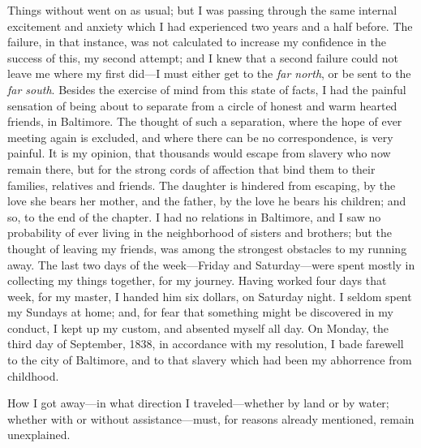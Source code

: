 Things without went on as usual; but I was passing through the same
internal excitement and anxiety which I had experienced two years and a
half before. The failure, in that instance, was not calculated to
increase my confidence in the success of this, my second attempt; and I
knew that a second failure could not leave me where my first did---I
must either get to the \emph{far north}, or be sent to the \emph{far
south}. Besides the exercise of mind from this state of facts, I had the
painful sensation of being about to separate from a circle of honest and
warm hearted friends, in Baltimore. The thought of such a separation,
where the hope of ever meeting again is excluded, and where there can be
no correspondence, is very painful. It is my opinion, that thousands
would escape from slavery who now remain there, but for the strong cords
of affection that bind them to their families, relatives and friends.
The daughter is hindered from escaping, by the love she bears her
mother, and the father, by the love he bears his children; and so, to
the end of the chapter. I had no relations in Baltimore, and I saw no
probability of ever living in the
{\protect\hypertarget{334}{}{}}neighborhood of sisters and brothers; but
the thought of leaving my friends, was among the strongest obstacles to
my running away. The last two days of the week---Friday and
Saturday---were spent mostly in collecting my things together, for my
journey. Having worked four days that week, for my master, I handed him
six dollars, on Saturday night. I seldom spent my Sundays at home; and,
for fear that something might be discovered in my conduct, I kept up my
custom, and absented myself all day. On Monday, the third day of
September, 1838, in accordance with my resolution, I bade farewell to
the city of Baltimore, and to that slavery which had been my abhorrence
from childhood.

How I got away---in what direction I traveled---whether by land or by
water; whether with or without assistance---must, for reasons already
mentioned, remain unexplained.
